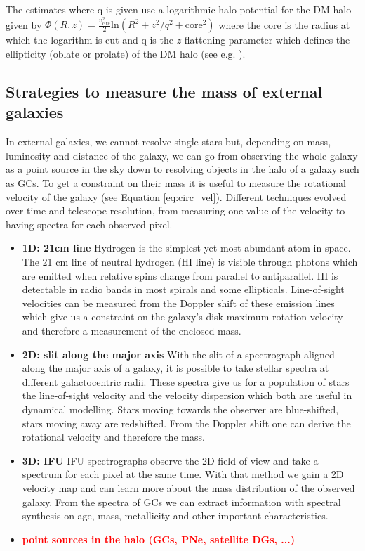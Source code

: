  The estimates where q is given use a logarithmic halo potential for the \ac{DM} halo given by $\Phi(R,z) = \frac{v_\mathrm{circ}^2}{2} \mathrm{ln}(R^2 +z^2/q^2 + \mathrm{core}^2)$ where the core is the radius at which the logarithm is cut and q is the $z$-flattening parameter which defines the ellipticity (oblate or prolate) of the \ac{DM} halo (see e.g. \citealp{Malhan...GD1stream...2018}).  

\subsection{Strategies to measure the mass of external galaxies}\label{subsec:mass_est_ext}
In external galaxies, we cannot resolve single stars but, depending on mass, luminosity and distance of the galaxy, we can go from observing the whole galaxy as a point source in the sky down to resolving objects in the halo of a galaxy such as \acp{GC}. To get a constraint on their mass it is useful to measure the rotational velocity of the galaxy (see Equation \ref{eq:circ_vel}). Different techniques evolved over time and telescope resolution, from measuring one value of the velocity to having spectra for each observed pixel.
\begin{itemize}
    \item\textbf{1D: 21cm line} Hydrogen is the simplest yet most abundant atom in space. The 21 cm line of neutral hydrogen (HI line) is visible through photons which are emitted when relative spins change from parallel to antiparallel. HI is detectable in radio bands in most spirals and some ellipticals. Line-of-sight velocities can be measured from the Doppler shift of these emission lines which give us a constraint on the galaxy's disk maximum rotation velocity and therefore a measurement of the enclosed mass.
    \item\textbf{2D: slit along the major axis} With the slit of a spectrograph aligned along the major axis of a galaxy, it is possible to take stellar spectra at different galactocentric radii. These spectra give us for a population of stars the line-of-sight velocity and the velocity dispersion which both are useful in dynamical modelling. Stars moving towards the observer are blue-shifted, stars moving away are redshifted. From the Doppler shift one can derive the rotational velocity and therefore the mass. 
    \item \textbf{3D: \acl{IFU}} \ac{IFU} spectrographs observe the 2D field of view and take a spectrum for each pixel at the same time. With that method we gain a 2D velocity map and can learn more about the mass distribution of the observed galaxy. From the spectra of \acp{GC} we can extract information with spectral synthesis on age, mass, metallicity and other important characteristics. 
    \item \textbf{\textcolor{red}{point sources in the halo (GCs, PNe, satellite DGs, ...)}}
\end{itemize}

